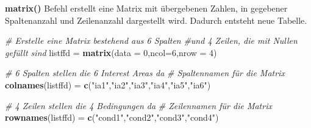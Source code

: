 \documentclass[]{book}
\newenvironment{Shaded}{\begin{snugshade}}{\end{snugshade}}
\newcommand{\KeywordTok}[1]{\textcolor[rgb]{0.13,0.29,0.53}{\textbf{#1}}}
\newcommand{\DataTypeTok}[1]{\textcolor[rgb]{0.13,0.29,0.53}{#1}}
\newcommand{\DecValTok}[1]{\textcolor[rgb]{0.00,0.00,0.81}{#1}}
\newcommand{\StringTok}[1]{\textcolor[rgb]{0.31,0.60,0.02}{#1}}
\newcommand{\CommentTok}[1]{\textcolor[rgb]{0.56,0.35,0.01}{\textit{#1}}}
\newcommand{\OperatorTok}[1]{\textcolor[rgb]{0.81,0.36,0.00}{\textbf{#1}}}
\newcommand{\NormalTok}[1]{#1}
\begin{document}
\textbf{matrix()} Befehl erstellt eine Matrix mit übergebenen Zahlen, in
gegebener Spaltenanzahl und Zeilenanzahl dargestellt wird. Dadurch
entsteht neue Tabelle.

\begin{Shaded}
\begin{Highlighting}[]
\CommentTok{# Erstelle eine Matrix bestehend aus 6 Spalten }
\CommentTok{#und 4 Zeilen, die mit Nullen gefüllt sind}
\NormalTok{listffd =}\StringTok{ }\KeywordTok{matrix}\NormalTok{(}\DataTypeTok{data =} \DecValTok{0}\NormalTok{,}\DataTypeTok{ncol=}\DecValTok{6}\NormalTok{,}\DataTypeTok{nrow =} \DecValTok{4}\NormalTok{)}

\CommentTok{# 6 Spalten stellen die 6 Interest Areas da}
\CommentTok{# Spaltennamen für die Matrix}
\KeywordTok{colnames}\NormalTok{(listffd) =}\StringTok{ }\KeywordTok{c}\NormalTok{(}\StringTok{"ia1"}\NormalTok{,}\StringTok{"ia2"}\NormalTok{,}\StringTok{"ia3"}\NormalTok{,}\StringTok{"ia4"}\NormalTok{,}\StringTok{"ia5"}\NormalTok{,}\StringTok{"ia6"}\NormalTok{)}

\CommentTok{# 4 Zeilen stellen die 4 Bedingungen da}
\CommentTok{# Zeilennamen für die Matrix}
\KeywordTok{rownames}\NormalTok{(listffd) =}\StringTok{ }\KeywordTok{c}\NormalTok{(}\StringTok{"cond1"}\NormalTok{,}\StringTok{"cond2"}\NormalTok{,}\StringTok{"cond3"}\NormalTok{,}\StringTok{"cond4"}\NormalTok{)}
\end{Highlighting}
\end{Shaded}

\begin{Shaded}
\end{Shaded}
\end{document}
